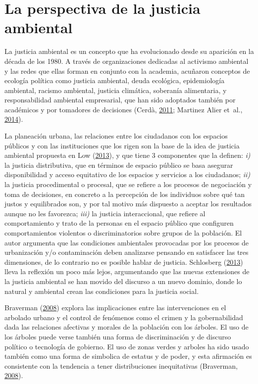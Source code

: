 \documentclass[12pt,a4paper,openany]{book}
\theoremstyle{definition}
\theoremstyle{definition}
\theoremstyle{definition}
\theoremstyle{remark}
\begin{document}
\section{La perspectiva de la justicia
ambiental}\label{la-perspectiva-de-la-justicia-ambiental}

La justicia ambiental es un concepto que ha evolucionado desde su
aparición en la década de los 1980. A través de organizaciones dedicadas
al activismo ambiental y las redes que ellas forman en conjunto con la
academia, acuñaron conceptos de ecología política como justicia
ambiental, deuda ecológica, epidemiología ambiental, racismo ambiental,
justicia climática, soberanía alimentaria, y responsabilidad ambiental
empresarial, que han sido adoptados también por académicos y por
tomadores de decisiones (Cerdà,
\protect\hyperlink{ref-cerda_origen_2011}{2011}; Martinez Alier et~al.,
\protect\hyperlink{ref-martinez_alier_between_2014}{2014}).

La planeación urbana, las relaciones entre los ciudadanos con los
espacios públicos y con las instituciones que los rigen son la base de
la idea de justicia ambiental propuesta en Low
(\protect\hyperlink{ref-low_public_2013}{2013}), y que tiene 3
componentes que la definen: \emph{i)} la justicia distributiva, que en
términos de espacio público se basa asegurar disponibilidad y acceso
equitativo de los espacios y servicios a los ciudadanos; \emph{ii)} la
justicia procedimental o procesal, que se refiere a los procesos de
negociación y toma de decisiones, en concreto a la percepción de los
individuos sobre qué tan justos y equilibrados son, y por tal motivo más
dispuesto a aceptar los resultados aunque no les favorezca; \emph{iii)}
la justicia interaccional, que refiere al comportamiento y trato de la
personas en el espacio público que configuren comportamientos violentos
o discriminatorios sobre grupos de la población. El autor argumenta que
las condiciones ambientales provocadas por los procesos de urbanización
y/o contaminación deben analizarse pensando en satisfacer las tres
dimensiones, de lo contrario no es posible hablar de justicia.
Schlosberg (\protect\hyperlink{ref-schlosberg_theorising_2013}{2013})
lleva la reflexión un poco más lejos, argumentando que las nuevas
extensiones de la justicia ambiental se han movido del discurso a un
nuevo dominio, donde lo natural y ambiental crean las condiciones para
la justicia social.

Braverman (\protect\hyperlink{ref-braverman_everybody_2008}{2008})
explora las implicaciones entre las intervenciones en el arbolado urbano
y el control de fenómenos como el crimen y la gobernabilidad dada las
relaciones afectivas y morales de la población con los árboles. El uso
de los árboles puede verse también una forma de discriminación y de
discurso político o tecnología de gobierno. El uso de zonas verdes y
arboles ha sido usado también como una forma de simbolica de estatus y
de poder, y esta afirmación es consistente con la tendencia a tener
distribuciones inequitativas (Braverman,
\protect\hyperlink{ref-braverman_everybody_2008}{2008}).
\end{document}

